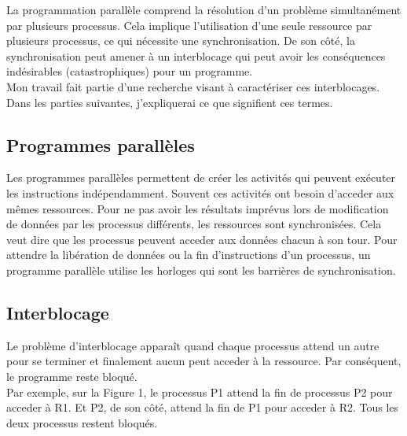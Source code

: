 \documentclass[12pt]{scrartcl}
\begin{document}
La programmation parallèle comprend la résolution d'un problème simultanément par plusieurs processus.
Cela implique l'utilisation d'une seule ressource par plusieurs processus, ce qui nécessite une synchronisation.
De son côté, la synchronisation peut amener à un interblocage qui peut avoir les conséquences indésirables (catastrophiques) pour un programme. \\
Mon travail fait partie d'une recherche visant à caractériser ces interblocages.\\
Dans les parties suivantes, j'expliquerai ce que signifient ces termes.   

\subsection{Programmes parallèles}

Les programmes parallèles permettent de créer les activités qui peuvent exécuter les instructions indépendamment. 
Souvent ces activités ont besoin d'acceder aux mêmes ressources. 
Pour ne pas avoir les résultats imprévus lors de modification de données par les processus différents, les ressources sont synchronisées. 
Cela veut dire que les processus peuvent acceder aux données chacun à son tour. 
Pour attendre la libération de données ou la fin d'instructions d'un processus, un programme parallèle utilise les horloges qui sont les barrières de synchronisation.
\newpage

\subsection{Interblocage}

Le problème d'interblocage apparaît quand chaque processus attend un autre pour se terminer et finalement aucun peut acceder à la ressource.
Par conséquent, le programme reste bloqué.\\

Par exemple, sur la Figure 1, le processus P1 attend la fin de processus P2 pour acceder à R1. Et P2, de son côté, attend la fin de P1 pour acceder à R2. Tous les deux processus restent bloqués.\\
\end{document}
